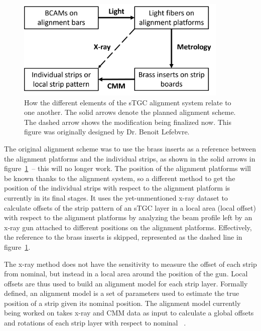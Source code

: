 \begin{figure}
    \centering
    \includegraphics[width = 0.9\textwidth]{figures/alignment_system_element_relations.png}
    \caption{How the different elements of the sTGC alignment system relate to one another. The solid arrows denote the planned alignment scheme. The dashed arrow shows the modification being finalized now. This figure was originally designed by Dr. Benoit Lefebvre.}
    \label{fig:alignment_elements}
\end{figure}

The original alignment scheme was to use the brass inserts as a reference between the alignment platforms and the individual strips, as shown in the solid arrows in figure~\ref{fig:alignment_elements}~-- this will no longer work. The position of the alignment platforms will be known thanks to the alignment system, so a different method to get the position of the individual strips with respect to the alignment platform is currently in its final stages. It uses the yet-unmentioned x-ray dataset to calculate offsets of the strip pattern of an sTGC layer in a local area (local offset) with respect to the alignment platforms by analyzing the beam profile left by an x-ray gun attached to different positions on the alignment platforms. Effectively, the reference to the brass inserts is skipped, represented as the dashed line in figure~\ref{fig:alignment_elements}. 

The x-ray method does not have the sensitivity to measure the offset of each strip from nominal, but instead in a local area around the position of the gun. Local offsets are thus used to build an alignment model for each strip layer. Formally defined, an alignment model is a set of parameters used to estimate the true position of a strip given its nominal position. The alignment model currently being worked on takes x-ray and CMM data as input to calculate a global offsets and rotations of each strip layer with respect to nominal~\cite{lefebvre_precision_2020} . 

